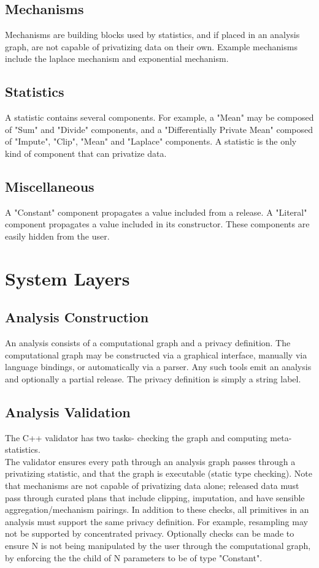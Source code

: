 \documentclass[11pt]{article}
\begin{document}
\subsection{Mechanisms}
Mechanisms are building blocks used by statistics, and if placed in an analysis graph, are not capable of privatizing data on their own. Example mechanisms include the laplace mechanism and exponential mechanism.

\subsection{Statistics}
A statistic contains several components. For example, a "Mean" may be composed of "Sum" and "Divide" components, and a "Differentially Private Mean" composed of "Impute", "Clip", "Mean" and "Laplace" components. A statistic is the only kind of component that can privatize data.

\subsection{Miscellaneous}
A "Constant" component propagates a value included from a release. A "Literal" component propagates a value included in its constructor. These components are easily hidden from the user.

\section{System Layers}
\subsection{Analysis Construction}
An analysis consists of a computational graph and a privacy definition. The computational graph may be constructed via a graphical interface, manually via language bindings, or automatically via a parser. Any such tools emit an analysis and optionally a partial release. The privacy definition is simply a string label.

\subsection{Analysis Validation}
The C++ validator has two tasks- checking the graph and computing meta-statistics. \\

The validator ensures every path through an analysis graph passes through a privatizing statistic, and that the graph is executable (static type checking). Note that mechanisms are not capable of privatizing data alone; released data must pass through curated plans that include clipping, imputation, and have sensible aggregation/mechanism pairings. In addition to these checks, all primitives in an analysis must support the same privacy definition. For example, resampling may not be supported by concentrated privacy. Optionally checks can be made to ensure N is not being manipulated by the user through the computational graph, by enforcing the the child of N parameters to be of type "Constant". \\
\end{document}
